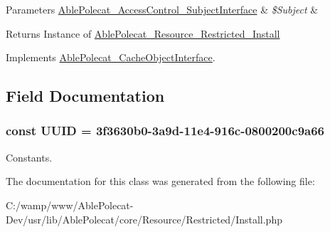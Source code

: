 \begin{DoxyParams}[1]{Parameters}
\hyperlink{interface_able_polecat___access_control___subject_interface}{Able\+Polecat\+\_\+\+Access\+Control\+\_\+\+Subject\+Interface} & {\em \$\+Subject} & \\
\hline
\end{DoxyParams}
\begin{DoxyReturn}{Returns}
Instance of \hyperlink{class_able_polecat___resource___restricted___install}{Able\+Polecat\+\_\+\+Resource\+\_\+\+Restricted\+\_\+\+Install} 
\end{DoxyReturn}


Implements \hyperlink{interface_able_polecat___cache_object_interface_a3f2135f6ad45f51d075657f6d20db2cd}{Able\+Polecat\+\_\+\+Cache\+Object\+Interface}.



\subsection{Field Documentation}
\hypertarget{class_able_polecat___resource___restricted___install_a74b892c8c0b86bf9d04c5819898c51e7}{}
\subsubsection[{U\+U\+I\+D}]{\setlength{\rightskip}{0pt plus 5cm}const U\+U\+I\+D = \textquotesingle{}3f3630b0-\/3a9d-\/11e4-\/916c-\/0800200c9a66\textquotesingle{}}\label{class_able_polecat___resource___restricted___install_a74b892c8c0b86bf9d04c5819898c51e7}
Constants. 

The documentation for this class was generated from the following file\+:\begin{DoxyCompactItemize}
\item 
C\+:/wamp/www/\+Able\+Polecat-\/\+Dev/usr/lib/\+Able\+Polecat/core/\+Resource/\+Restricted/Install.\+php\end{DoxyCompactItemize}
